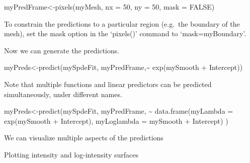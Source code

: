 \documentclass[
]{article}
\newenvironment{Shaded}{\begin{snugshade}}{\end{snugshade}}
\newcommand{\AttributeTok}[1]{\textcolor[rgb]{0.77,0.63,0.00}{#1}}
\newcommand{\ConstantTok}[1]{\textcolor[rgb]{0.00,0.00,0.00}{#1}}
\newcommand{\DecValTok}[1]{\textcolor[rgb]{0.00,0.00,0.81}{#1}}
\newcommand{\FunctionTok}[1]{\textcolor[rgb]{0.00,0.00,0.00}{#1}}
\newcommand{\NormalTok}[1]{#1}
\newcommand{\OtherTok}[1]{\textcolor[rgb]{0.56,0.35,0.01}{#1}}
\newcommand{\SpecialCharTok}[1]{\textcolor[rgb]{0.00,0.00,0.00}{#1}}
\begin{document}
\begin{Shaded}
\begin{Highlighting}[]
\NormalTok{myPredFrame}\OtherTok{\textless{}{-}}\FunctionTok{pixels}\NormalTok{(myMesh, }\AttributeTok{nx =} \DecValTok{50}\NormalTok{, }\AttributeTok{ny =} \DecValTok{50}\NormalTok{, }\AttributeTok{mask =} \ConstantTok{FALSE}\NormalTok{)}
\end{Highlighting}
\end{Shaded}

To constrain the predictions to a particular region (e.g.~the boundary
of the mesh), set the mask option in the `pixels()' command to
`mask=myBoundary'.

Now we can generate the predictions.

\begin{Shaded}
\begin{Highlighting}[]
\NormalTok{myPreds}\OtherTok{\textless{}{-}}\FunctionTok{predict}\NormalTok{(mySpdeFit, myPredFrame,}\SpecialCharTok{\textasciitilde{}} \FunctionTok{exp}\NormalTok{(mySmooth }\SpecialCharTok{+}\NormalTok{ Intercept))}
\end{Highlighting}
\end{Shaded}

Note that multiple functions and linear predictors can be predicted
simultaneously, under different names.

\begin{Shaded}
\begin{Highlighting}[]
\NormalTok{myPreds}\OtherTok{\textless{}{-}}\FunctionTok{predict}\NormalTok{(mySpdeFit, myPredFrame,  }
                 \SpecialCharTok{\textasciitilde{}} \FunctionTok{data.frame}\NormalTok{(}\AttributeTok{myLambda =} \FunctionTok{exp}\NormalTok{(mySmooth }\SpecialCharTok{+}\NormalTok{ Intercept),}
                              \AttributeTok{myLoglambda =}\NormalTok{ mySmooth }\SpecialCharTok{+}\NormalTok{ Intercept)}
\NormalTok{                )}
\end{Highlighting}
\end{Shaded}

We can visualize multiple aspects of the predictions

Plotting intensity and log-intensity surfaces
\end{document}
